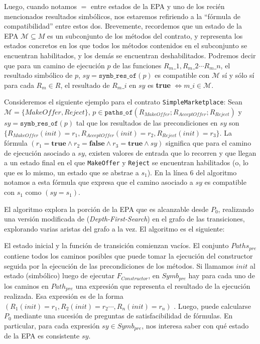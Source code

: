 Luego, cuando notamos $=$ entre estados de la EPA y uno de los recién mencionados resultados simbólicos, nos estaremos refiriendo a la ``fórmula de compatibilidad'' entre estos dos.
Brevemente, recordemos que un estado de la EPA $\mathcal{M} \subseteq M$ es un subconjunto de los métodos del contrato, y representa los estados concretos en los que todos los métodos contenidos en el subconjunto se encuentran habilitados, y los demás se encuentran deshabilitados.
Podremos decir que para un camino de ejecución $p$ de las funciones $R_m\_1,R_m\_2 \cdots R_m\_n$, el resultado simbólico de $p$, $sy = \texttt{symb\_res\_of}(p)$ es compatible con $\mathcal{M}$ sí y sólo sí para cada $R_m \in R$, el resultado de $R_m\_i$ en $sy$ es \textbf{true} $\iff m\_i \in \mathcal{M}$.

Consideremos el siguiente ejemplo para el contrato \texttt{SimpleMarketplace}:
Sean $\mathcal{M} = \{MakeOffer, Reject\}$, $ p \in \texttt{paths\_of}(R_{MakeOffer}; R_{AcceptOffer}; R_{Reject})$ y $sy = \texttt{symb\_res\_of}(p)$ tal que los resultados de las precondiciones en $sy$ son $\{R_{MakeOffer}(init) = r_1, R_{AcceptOffer}(init) = r_2, R_{Reject}(init) = r_3\}$.
La fórmula $(r_1 = \textbf{true} \land r_2 = \textbf{false} \land r_3 = \textbf{true} \land sy)$ significa que para el camino de ejecución asociado a $sy$, existen valores de entrada que lo recorren y que llegan a un estado final en el que \texttt{MakeOffer} y \texttt{Reject} se encuentran habilitados (o, lo que es lo mismo, un estado que se abstrae a $s_1$).
En la línea 6 del algoritmo notamos a esta fórmula que expresa que el camino asociado a $sy$ es compatible con $s_1$ como $(sy = s_1)$.


El algoritmo explora la porción de la EPA que es alcanzable desde $P_0$, realizando una versión	modificada de (\textit{Depth-First-Search}) en el grafo de las transiciones, explorando varias aristas del grafo a la vez.
El algoritmo es el siguiente:


%    

El estado inicial y la función de transición comienzan vacíos.
El conjunto ${Paths_{pre}}$ contiene todos los caminos posibles que puede tomar la ejecución del constructor seguida por la ejecución de las precondiciones de los métodos.
Si llamamos $init$ al estado (simbólico) luego de ejecutar $F_{Constructor}$, en $Symb_{pre}$ hay para cada uno de los caminos en $Path_{pre}$ una expresión que representa el resultado de la ejecución realizada. Esa expresión es de la forma $(R_1(init) = r_1 , R_2(init) = r_2 \cdots , R_n(init) = r_n)$ .
Luego, puede calcularse $P_0$ mediante una sucesión de preguntas de satisfacibilidad de fórmulas.
En particular, para cada expresión $sy \in Symb_{pre}$, nos interesa saber con qué estado de la EPA es consistente $sy$.


